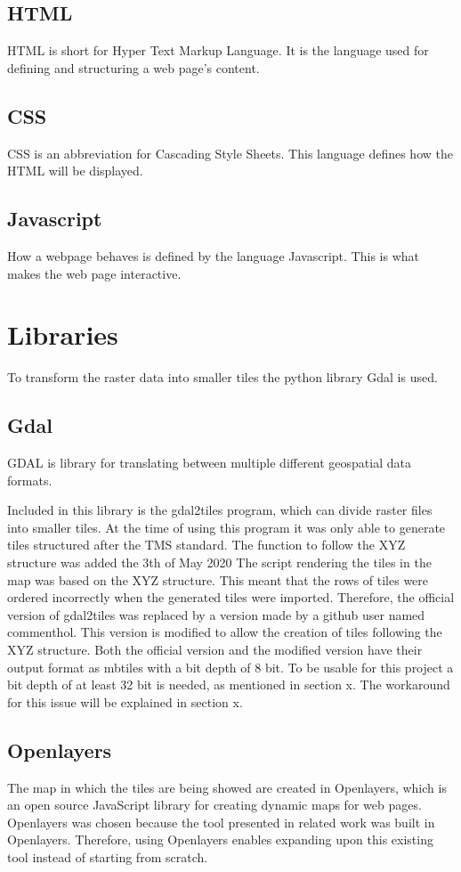 \subsection*{HTML}
HTML is short for Hyper Text Markup Language. It is the language used for defining and structuring a web page’s content.
\subsection*{CSS}
CSS is an abbreviation for Cascading Style Sheets. This language defines how the HTML will be displayed.
\subsection*{Javascript}
How a webpage behaves is defined by the language Javascript.  This is what makes the web page interactive. 
\citep{WhatIsJs}

\section{Libraries}
To transform the raster data into smaller tiles the python library Gdal is used. 
\subsection*{Gdal}
GDAL is library for translating between multiple different geospatial data formats. \citep{GDAL} 

Included in this library is the gdal2tiles program, which can divide raster files into smaller tiles. 
At the time of using this program it was only able to generate tiles structured after the TMS standard. The function to follow the XYZ structure was added the 3th of May 2020 \citep{gdal2tilesDoc} \citep{GdalRelease}
%
The script rendering the tiles in the map was based on the XYZ structure. This meant that the rows of tiles were ordered incorrectly when the generated tiles were imported. Therefore, the official version of gdal2tiles was replaced by a version made by a github user named commenthol. This version is modified to allow the creation of tiles following the XYZ structure. \citep{gdalLeaflet}
Both the official version and the modified version have their output format as mbtiles with a bit depth of 8 bit. To be usable for this project a bit depth of at least 32 bit is needed, as mentioned in section x. The workaround for this issue will be explained in section x. 
\subsection*{Openlayers}
The map in which the tiles are being showed are created in Openlayers, which is an open source JavaScript library for creating dynamic maps for web pages. 
\citep{OL}
Openlayers was chosen because the tool presented in related work was built in Openlayers. Therefore, using Openlayers enables expanding upon this existing tool instead of starting from scratch. 

